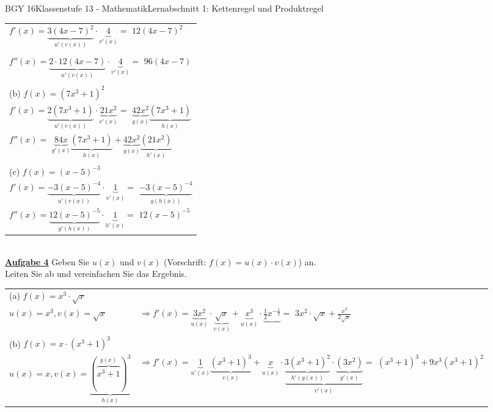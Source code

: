 \documentclass[oneside,openany,headings=optiontotoc,11pt,numbers=noenddot]{scrreprt}
\begin{document}
\begin{worksheet}{BGY 16}{Klassenstufe 13 - Mathematik}{Lernabschnitt 1: Kettenregel und Produktregel}
\begin{framed}
\begin{tabularx}{\textwidth}{l}
				\(f'(x) = \underbrace{3(4x-7)^2}_{u'(v(x))}\cdot{}\underbrace{4}_{v'(x)} =\) \colorbox{green!10}{\( 12(4x-7)^2\)}\\
				\\
				\(f''(x) = \underbrace{2\cdot{}12(4x-7)}_{u'(v(x))}\cdot{}\underbrace{4}_{v'(x)} = \) \colorbox{green!10}{\(96(4x-7)\)}\\
				\\
				(b) \(f(x) = (7x^3 + 1)^2\)\\
				\(f'(x) = \underbrace{2(7x^3+1)}_{u'(v(x))}\cdot{}\underbrace{21x^2}_{v'(x)} =\) \colorbox{green!10}{\(\underbrace{42x^2}_{g(x)}\underbrace{(7x^3+1)}_{h(x)}\)}\\
				\(f''(x) =\) \colorbox{green!10}{\( \underbrace{84x}_{g'(x)}\underbrace{(7x^3+1)}_{h(x)} + \underbrace{42x^2}_{g(x)}\underbrace{(21x^2)}_{h'(x)}\)}\\
				\\
				(c) \(f(x) = (x-5)^{-3}\)\\
				\(f'(x) = \underbrace{-3(x-5)^{-4}}_{u'(v(x))}\cdot\underbrace{1}_{v'(x)} =\) \colorbox{green!10}{\(\underbrace{-3(x-5)^{-4}}_{g(h(x))}\)}\\
				\(f''(x) = \underbrace{12(x-5)^{-5}}_{g'(h(x))}\cdot\underbrace{1}_{h'(x)} =\) \colorbox{green!10}{\(12(x-5)^{-5}\)}\\
			\end{tabularx}\\
			\newpage
			\textbf{\underline{Aufgabe 4}} Geben Sie \(u(x)\) und \(v(x)\) (Vorschrift: \(f(x) = u(x)\cdot{}v(x)\)) an.\\
			Leiten Sie ab und vereinfachen Sie das Ergebnis.\\
			\begin{tabularx}{\textwidth}{lX}
				(a) \(f(x) = x^3\cdot{}\sqrt{x}\)\\
				\(u(x) = x^3, v(x) = \sqrt{x}\) & \(\Rightarrow f'(x) = \underbrace{3x^2}_{u(x)}\cdot\underbrace{\sqrt{x}}_{v(x)} + \underbrace{x^3}_{u(x)}\cdot\underbrace{\frac{1}{2}x^{-\frac{1}{2}}} =\) \colorbox{green!=10}{\(3x^2\cdot\sqrt{x}+\frac{x^3}{2\sqrt{x}}\)}\\
				(b) \(f(x) = x\cdot(x^3+1)^3\)\\
				\(u(x) = x, v(x) = \underbrace{(\overbrace{x^3+1}^{g(x)})^3}_{h(x)}\) & \(\Rightarrow f'(x) = \underbrace{1}_{u'(x)}\underbrace{(x^3+1)^3}_{v(x)} + \underbrace{x}_{u(x)}\cdot\underbrace{\underbrace{3(x^3+1)^2}_{h'(g(x))}\cdot\underbrace{(3x^2)}_{g'(x)}}_{v'(x)} = \) \colorbox{green!10}{\((x^3+1)^3 + 9x^3(x^3+1)^2\)}\\

\end{tabularx}
\end{framed}
\end{worksheet}
\end{document}
